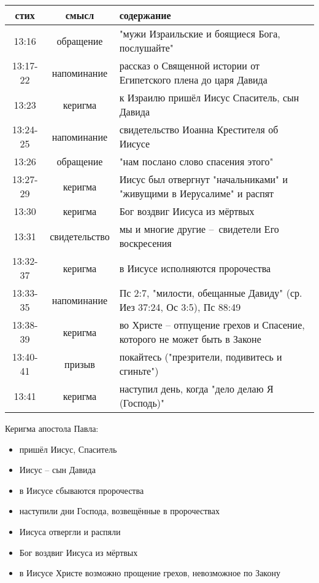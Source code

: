 \begin{center}
	\begin{longtable}{ |c|c|p{}| } 
		\hline
		стих & смысл & содержание \\
		\hline\hline
		13:16 & обращение & "мужи Израильские и боящиеся Бога, послушайте" \\
		13:17-22 & напоминание & рассказ о Священной истории от Египетского плена до царя Давида \\
		13:23 & керигма & к Израилю пришёл Иисус Спаситель, сын Давида \\
		13:24-25 & напоминание & свидетельство Иоанна Крестителя об Иисусе \\
		13:26 & обращение & "нам послано слово спасения этого" \\
		13:27-29 & керигма & Иисус был отвергнут "начальниками" и "живущими в Иерусалиме" и распят \\
		13:30 & керигма & Бог воздвиг Иисуса из мёртвых \\
		13:31 & свидетельство & мы и многие другие – свидетели Его воскресения \\
		13:32-37 & керигма & в Иисусе исполняются пророчества \\
		13:33-35 & напоминание & Пс 2:7, "милости, обещанные Давиду" (ср. Иез 37:24, Ос 3:5), Пс 88:49 \\
		13:38-39 & керигма & во Христе – отпущение грехов и Спасение, которого не может быть в Законе \\
		13:40-41 & призыв & покайтесь ("презрители, подивитесь и сгиньте") \\
		13:41 & керигма & наступил день, когда "дело делаю Я (Господь)" \\
		\hline
	\end{longtable}
\end{center}

Керигма апостола Павла:
\begin{itemize}
	\item пришёл Иисус, Спаситель
	\item Иисус – сын Давида
	\item в Иисусе сбываются пророчества
	\item наступили дни Господа, возвещённые в пророчествах
	\item Иисуса отвергли и распяли
	\item Бог воздвиг Иисуса из мёртвых
	\item в Иисусе Христе возможно прощение грехов, невозможное по Закону
\end{itemize}

